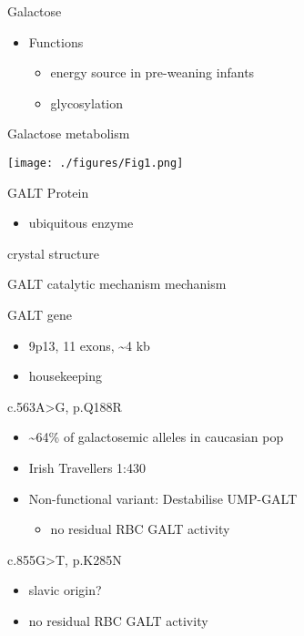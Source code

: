\documentclass[presentation, smaller]{beamer}
\begin{document}
\begin{frame}[label={sec:org3f8b2bd}]{Galactose}
\begin{itemize}
\item Functions
\begin{itemize}
\item energy source in pre-weaning infants
\item glycosylation
\end{itemize}
\end{itemize}
\end{frame}

\begin{frame}[label={sec:orgb12169a}]{Galactose metabolism}
\begin{center}
\texttt{[image: ./figures/Fig1.png]}
\end{center}
\end{frame}

\begin{frame}[label={sec:org54ccc22}]{GALT Protein}
\begin{itemize}
\item ubiquitous enzyme
\end{itemize}

\alert{crystal structure}
\end{frame}

\begin{frame}[label={sec:org41a94d0}]{GALT catalytic mechanism}
\alert{mechanism}
\end{frame}

\begin{frame}[label={sec:orge06c9f8}]{GALT gene}
\begin{itemize}
\item 9p13, 11 exons, \textasciitilde{}4 kb
\item housekeeping
\end{itemize}
\begin{block}{c.563A>G, p.Q188R}
\begin{itemize}
\item \textasciitilde{}64\% of galactosemic alleles in caucasian pop
\item Irish Travellers 1:430
\item Non-functional variant: Destabilise UMP-GALT
\begin{itemize}
\item no residual RBC GALT activity
\end{itemize}
\end{itemize}
\end{block}

\begin{block}{c.855G>T, p.K285N}
\begin{itemize}
\item slavic origin?
\item no residual RBC GALT activity
\end{itemize}
\end{block}
\end{frame}
\end{document}
